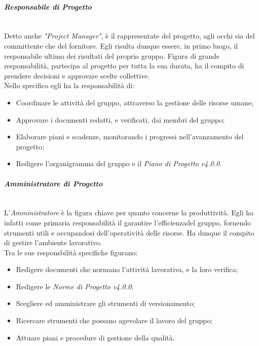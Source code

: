 \paragraph{\textit{Responsabile di Progetto}} ~\\
	Detto anche \textit{"Project Manager"}, è il rappresentate del progetto\glossario, agli occhi sia del committente che del 			fornitore. Egli risulta dunque essere, in primo luogo, il responsabile ultimo dei risultati del proprio gruppo. 			Figura di grande responsabilità, partecipa al progetto per tutta la sua durata, ha il compito di prendere 						decisioni 	e approvare scelte collettive.\\
	Nello specifico egli ha la responsabilità di:
	\begin{itemize}
	\item Coordinare le attività del gruppo, attraverso la gestione delle risorse umane;
	\item Approvare i documenti redatti, e verificati, dai membri del gruppo;
	\item Elaborare piani e scadenze, monitorando i progressi nell'avanzamento del progetto;
	\item Redigere l'organigramma del gruppo e il \textit{Piano di Progetto v4.0.0}.
	\end{itemize}

\paragraph{\textit{Amministratore di Progetto}} ~\\
	L'\textit{Amministratore} è la figura chiave per quanto concerne la produttività. Egli ha infatti come primaria 							responsabilità il garantire l'efficienza\glossario del gruppo, fornendo strumenti utili e occupandosi 								dell'operatività delle risorse. Ha dunque il compito di gestire l'ambiente lavorativo.\\
	Tra le sue responsbilità specifiche figurano:
	\begin{itemize}
	\item Redigere documenti che normano l'attività lavorativa, e la loro verifica;
	\item Redigere le \textit{Norme di Progetto v4.0.0};
	\item Scegliere ed amministrare gli strumenti di versionamento\glossario;
	\item Ricercare strumenti che possano agevolare il lavoro del gruppo;
	\item Attuare piani e procedure di gestione della qualità\glossario.
	\end{itemize}

